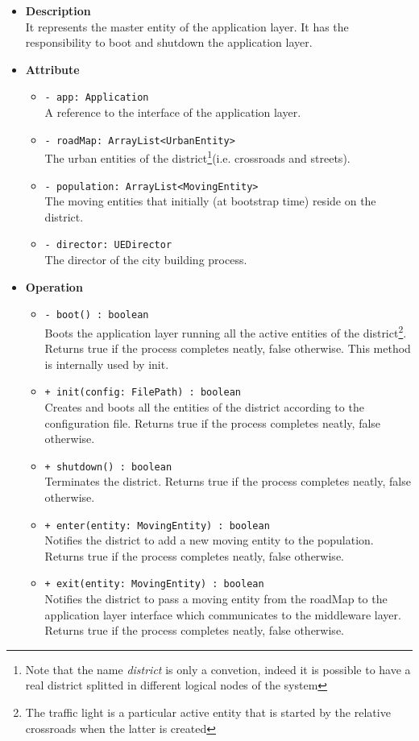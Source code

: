 \begin{itemize}
  \item \textbf{Description} \\
It represents the master entity of the application layer. 
It has the responsibility to boot and shutdown the application layer.
  \item \textbf{Attribute}
  \begin{itemize}
    \item \texttt{- app: Application} \\
A reference to the interface of the application layer.
    \item \texttt{- roadMap: ArrayList<UrbanEntity>} \\
The urban entities of the district\footnote{Note that the name 
\textit{district} is only a convetion, indeed it is possible to have a 
real district splitted in different logical nodes of the system}(i.e. crossroads
and streets). 
    \item \texttt{- population: ArrayList<MovingEntity>} \\
The moving entities that initially (at bootstrap time) reside on the district.
    \item \texttt{- director: UEDirector} \\ 
The director of the city building process.
  \end{itemize}
  \item \textbf{Operation}
  \begin{itemize} 
    \item \texttt{- boot() : boolean} \\
Boots the application layer running all the active entities of the 
district\footnote{The traffic light is a particular active entity that 
is started by the relative crossroads when the latter is created}. 
Returns true if the process completes neatly, false otherwise. 
This method is internally used by init.
    \item \texttt{+ init(config: FilePath) : boolean} \\
Creates and boots all the entities of the district according to the 
configuration file. Returns true if the process completes neatly, false 
otherwise.
    \item \texttt{+ shutdown() : boolean} \\
Terminates the district. Returns true if the process completes neatly,
false otherwise.
    \item \texttt{+ enter(entity: MovingEntity) : boolean} \\
Notifies the district to add a new moving entity to the population.
Returns true if the process completes neatly, false otherwise.
    \item \texttt{+ exit(entity: MovingEntity) : boolean} \\
Notifies the district to pass a moving entity from the roadMap to the 
application layer interface which communicates to the middleware layer.
Returns true if the process completes neatly, false otherwise.
  \end{itemize}
\end{itemize} 
